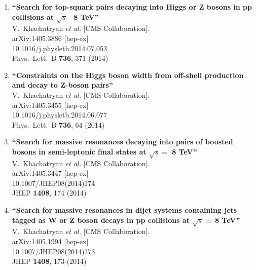 \documentclass{article}
\begin{document}
\begin{enumerate}
\item%
{\bf ``Search for top-squark pairs decaying into Higgs or Z bosons in pp collisions at $\sqrt{s}$=8 TeV''}
  \\{}V.~Khachatryan {\it et al.}  [CMS Collaboration].
  \\{}arXiv:1405.3886 [hep-ex]
    \\{}10.1016/j.physletb.2014.07.053
\\{}Phys.\ Lett.\ B {\bf 736}, 371 (2014) %


\item%
{\bf ``Constraints on the Higgs boson width from off-shell production and decay to Z-boson pairs''}
  \\{}V.~Khachatryan {\it et al.}  [CMS Collaboration].
  \\{}arXiv:1405.3455 [hep-ex]
    \\{}10.1016/j.physletb.2014.06.077
\\{}Phys.\ Lett.\ B {\bf 736}, 64 (2014) %


\item%
{\bf ``Search for massive resonances decaying into pairs of boosted bosons in semi-leptonic final states at $\sqrt{s} =$ 8 TeV''}
  \\{}V.~Khachatryan {\it et al.}  [CMS Collaboration].
  \\{}arXiv:1405.3447 [hep-ex]
    \\{}10.1007/JHEP08(2014)174
\\{}JHEP {\bf 1408}, 174 (2014) %


\item%
{\bf ``Search for massive resonances in dijet systems containing jets tagged as W or Z boson decays in pp collisions at $ \sqrt{s} $ = 8 TeV''}
  \\{}V.~Khachatryan {\it et al.}  [CMS Collaboration].
  \\{}arXiv:1405.1994 [hep-ex]
    \\{}10.1007/JHEP08(2014)173
\\{}JHEP {\bf 1408}, 173 (2014) %



\end{enumerate}
\end{document}
